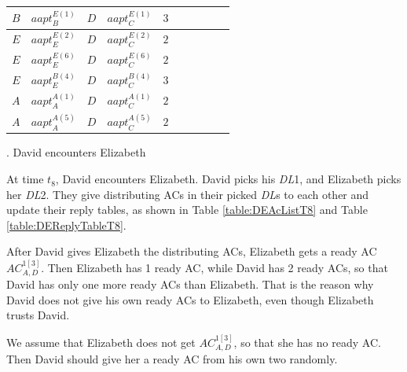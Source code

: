 \begin{table} [H]
\begin{tabu}{|c|c|c|c|c|c|c|c|c|c|}
$B$ & ${aapt}_{B}^{E\left(1\right)}$ & $D$ & ${aapt}_{C}^{E\left(1\right)}$ & $3$ &  &  &  &  &  \\ \hline
$E$ & ${aapt}_{E}^{E\left(2\right)}$ & $D$ & ${aapt}_{C}^{E\left(2\right)}$ & $2$ &  &  &  &  &  \\ \hline
$E$ & ${aapt}_{E}^{E\left(6\right)}$ & $D$ & ${aapt}_{C}^{E\left(6\right)}$ & $2$ &  &  &  &  &  \\ \hline
$E$ & ${aapt}_{E}^{B\left(4\right)}$ & $D$ & ${aapt}_{C}^{B\left(4\right)}$ & $3$ &  &  &  &  &  \\ \hline
$A$ & ${aapt}_{A}^{A\left(1\right)}$ & $D$ & ${aapt}_{C}^{A\left(1\right)}$ & $2$ &  &  &  &  &  \\ \hline
$A$ & ${aapt}_{A}^{A\left(5\right)}$ & $D$ & ${aapt}_{C}^{A\left(5\right)}$ & $2$ &  &  &  &  &  \\ \hline
\end{tabu}
\end{table}


.  David encounters Elizabeth

At time ${t}_{8}$, David encounters Elizabeth. David picks his \textit{DL}1, and Elizabeth picks her \textit{DL}2. They give distributing ACs in their picked \textit{DL}s to each other and update their reply tables, as shown in Table \ref{table:DEAcListT8} and Table \ref{table:DEReplyTableT8}.

After David gives Elizabeth the distributing ACs, Elizabeth gets a ready AC ${AC}^{1\left[3\right]}_{A,D}$. Then Elizabeth has 1 ready AC, while David has 2 ready ACs, so that David has only one more ready ACs than Elizabeth. That is the reason why David does not give his own ready ACs to Elizabeth, even though Elizabeth trusts David. 

We assume that Elizabeth does not get ${AC}^{1\left[3\right]}_{A,D}$, so that she has no ready AC. Then David should give her a ready AC from his own two randomly.

